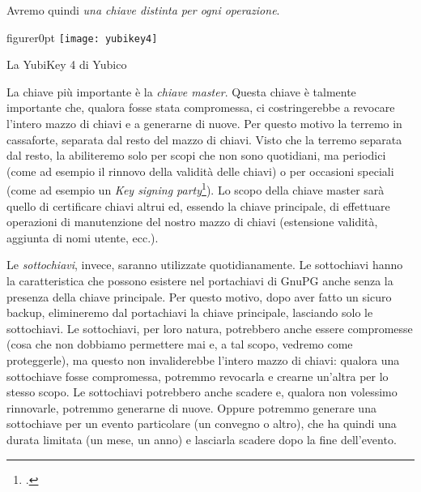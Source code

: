 Avremo quindi \emph{una chiave distinta per ogni operazione}.\bigskip

\begin{wrapfloat}{figure}{r}{0pt}
  \texttt{[image: yubikey4]}
  \caption{La YubiKey 4 di Yubico}
  \label{fig:yubikey4}
\end{wrapfloat}

La chiave più importante è la \emph{chiave master}. Questa chiave è talmente
importante che, qualora fosse stata compromessa, ci costringerebbe a revocare
l'intero mazzo di chiavi e a generarne di nuove. Per questo motivo la terremo in
cassaforte, separata dal resto del mazzo di chiavi. Visto che la terremo
separata dal resto, la abiliteremo solo per scopi che non sono quotidiani, ma
periodici (come ad esempio il rinnovo della validità delle chiavi) o per
occasioni speciali (come ad esempio un \emph{Key signing
party}\footcite[Vedi][]{wiki:ksp}). Lo scopo della chiave master sarà quello di
certificare chiavi altrui ed, essendo la chiave principale, di effettuare
operazioni di manutenzione del nostro mazzo di chiavi (estensione validità,
aggiunta di nomi utente, ecc.).

Le \emph{sottochiavi}, invece, saranno utilizzate quotidianamente. Le
sottochiavi hanno la caratteristica che possono esistere nel portachiavi di
GnuPG anche senza la presenza della chiave principale. Per questo motivo, dopo
aver fatto un sicuro backup, elimineremo dal portachiavi la chiave principale,
lasciando solo le sottochiavi. Le sottochiavi, per loro natura, potrebbero anche
essere compromesse (cosa che non dobbiamo permettere mai e, a tal scopo, vedremo
come proteggerle), ma questo non invaliderebbe l'intero mazzo di chiavi: qualora
una sottochiave fosse compromessa, potremmo revocarla e crearne un'altra per lo
stesso scopo. Le sottochiavi potrebbero anche scadere e, qualora non volessimo
rinnovarle, potremmo generarne di nuove. Oppure potremmo generare una
sottochiave per un evento particolare (un convegno o altro), che ha quindi una
durata limitata (un mese, un anno) e lasciarla scadere dopo la fine
dell'evento.\bigskip

